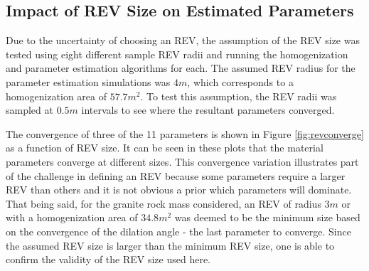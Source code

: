 \subsection{Impact of REV Size on Estimated Parameters}

Due to the uncertainty of choosing an REV, the assumption of the REV size was tested using eight different sample REV radii and running the homogenization and parameter estimation algorithms for each. The assumed REV radius for the parameter estimation simulations was $4m$, which corresponds to a homogenization area of $57.7 m^2$. To test this assumption, the REV radii was sampled at $0.5m$ intervals to see where the resultant parameters converged.

The convergence of three of the 11 parameters is shown in Figure \ref{fig:revconverge} as a function of REV size. It can be seen in these plots that the material parameters converge at different sizes. This convergence variation illustrates part of the challenge in defining an REV because some parameters require a larger REV than others and it is not obvious a prior which parameters will dominate. That being said, for the granite rock mass considered, an REV of radius $3m$ or with a homogenization area of $34.8 m^2$ was deemed to be the minimum size based on the convergence of the dilation angle - the last parameter to converge. Since the assumed REV size is larger than the minimum REV size, one is able to confirm the validity of the REV size used here.